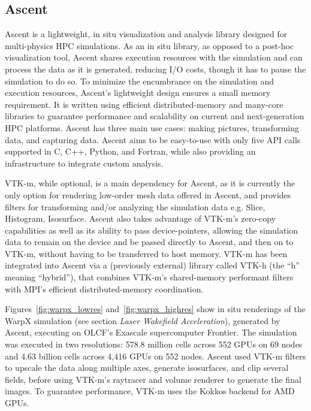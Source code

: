 \subsection{Ascent}
Ascent is a lightweight, in situ visualization and analysis library designed for multi-physics HPC simulations. As an in situ library, as opposed to a post-hoc visualization tool, Ascent shares execution resources with the simulation and can process the data as it is generated, reducing I/O costs, though it has to pause the simulation to do so. To minimize the encumbrance on the simulation and execution resources, Ascent's lightweight design ensures a small memory requirement. It is written using efficient distributed-memory and many-core libraries to guarantee performance and scalability on current and next-generation HPC platforms. Ascent has three main use cases: making pictures, transforming data, and capturing data. Ascent aims to be easy-to-use with only five API calls supported in C, C++, Python, and Fortran, while also providing an infrastructure to integrate custom analysis.

VTK-m, while optional, is a main dependency for Ascent, as it is currently the only option for rendering low-order mesh data offered in Ascent, and provides filters for transforming and/or analyzing the simulation data e.g. Slice, Histogram, Isosurface. Ascent also takes advantage of VTK-m's zero-copy capabilities as well as its ability to pass device-pointers, allowing the simulation data to remain on the device and be passed directly to Ascent, and then on to VTK-m, without having to be transferred to host memory. VTK-m has been integrated into Ascent via a (previously external) library called VTK-h (the ``h'' meaning ``hybrid''), that combines VTK-m's shared-memory performant filters with MPI's efficient distributed-memory coordination. 

Figures~\ref{fig:warpx_lowres} and~\ref{fig:warpx_highres} show in situ renderings of the WarpX simulation (see section \textit{Laser Wakefield Acceleration}), generated by Ascent, executing on OLCF's Exascale supercomputer Frontier.
The simulation was executed in two resolutions: 578.8 million cells across 552 GPUs on 69 nodes and 4.63 billion cells across 4,416 GPUs on 552 nodes.
Ascent used VTK-m filters to upscale the data along multiple axes, generate isosurfaces, and clip several fields, before using VTK-m's raytracer and volume renderer to generate the final images.
To guarantee performance, VTK-m uses the Kokkos backend for AMD GPUs. 


